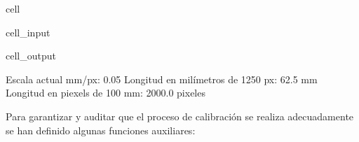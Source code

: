 \documentclass[a4paper,10pt,spanish]{jupyterBook}
\begin{document}
\begin{sphinxuseclass}{cell}\begin{sphinxVerbatimInput}

\begin{sphinxuseclass}{cell_input}
\begin{sphinxVerbatim}[commandchars=\\\{\}]
\end{sphinxVerbatim}

\end{sphinxuseclass}\end{sphinxVerbatimInput}
\begin{sphinxVerbatimOutput}

\begin{sphinxuseclass}{cell_output}
\begin{sphinxVerbatim}[commandchars=\\\{\}]
Escala actual mm/px: 0.05
Longitud en milímetros de 1250 px: 62.5 mm
Longitud en piexels de 100 mm: 2000.0 pixeles
\end{sphinxVerbatim}

\end{sphinxuseclass}\end{sphinxVerbatimOutput}

\end{sphinxuseclass}
\sphinxAtStartPar
Para garantizar y auditar que el proceso de calibración se realiza adecuadamente se han definido algunas funciones auxiliares:

\sphinxAtStartPar
{}
\end{document}
